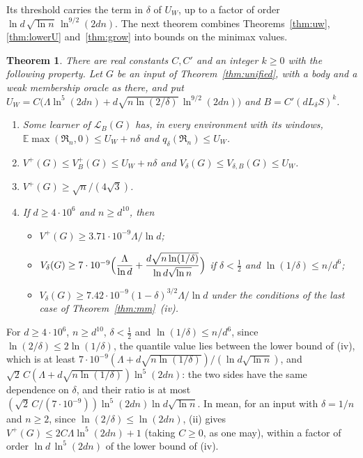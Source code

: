 \documentclass[11pt]{amsart}
\newtheorem{theorem}{Theorem}[section]
\theoremstyle{definition}
\numberwithin{equation}{section}
\newcommand{\E}{\mathbb{E}}
\newcommand{\Reg}{\mathfrak{R}}
\begin{document}
Its threshold carries the term in $\delta$ of $U_W$, up to a factor of order $\ln d\,\sqrt{\ln n}\,\ln^{9/2}(2dn)$. The next theorem combines Theorems~\ref{thm:uw}, \ref{thm:lowerU} and~\ref{thm:grow} into bounds on the minimax values.

\begin{theorem}\label{thm:mmm}
There are real constants $C,C'$ and an integer $k\ge0$ with the following property. Let $G$ be an input of Theorem~\ref{thm:unified}, with a body and a weak membership oracle as there, and put $U_W=C\bigl(\Lambda\ln^5(2dn)+d\sqrt{n\ln(2/\delta)}\,\ln^{9/2}(2dn)\bigr)$ and $B=C'(dL_\delta S)^k$.
\begin{enumerate}[label=(\roman*)]
\item Some learner of $\mathcal L_B(G)$ has, in every environment with its windows, $\E\max(\Reg_n,0)\le U_W+n\delta$ and $q_\delta(\Reg_n)\le U_W$.
\item $V^+(G)\le V^+_B(G)\le U_W+n\delta$ and $V_\delta(G)\le V_{\delta,B}(G)\le U_W$.
\item $V^+(G)\ge\sqrt n/(4\sqrt3)$.
\item If $d\ge4\cdot10^6$ and $n\ge d^{10}$, then
\begin{itemize}[leftmargin=*]
\item $V^+(G)\ge3.71\cdot10^{-9}\Lambda/\ln d$;
\item $V_\delta(G)\ge7\cdot10^{-9}\Bigl(\dfrac\Lambda{\ln d}+\dfrac{d\sqrt{n\ln(1/\delta)}}{\ln d\sqrt{\ln n}}\Bigr)$ if $\delta<\frac12$ and $\ln(1/\delta)\le n/d^6$;
\item $V_\delta(G)\ge7.42\cdot10^{-9}(1-\delta)^{3/2}\Lambda/\ln d$ under the conditions of the last case of Theorem~\ref{thm:mm}~(iv).
\end{itemize}
\end{enumerate}
\end{theorem}

For $d\ge4\cdot10^6$, $n\ge d^{10}$, $\delta<\frac12$ and $\ln(1/\delta)\le n/d^6$, since $\ln(2/\delta)\le2\ln(1/\delta)$, the quantile value lies between the lower bound of (iv), which is at least $7\cdot10^{-9}(\Lambda+d\sqrt{n\ln(1/\delta)})/(\ln d\sqrt{\ln n})$, and $\sqrt2\,C(\Lambda+d\sqrt{n\ln(1/\delta)})\ln^5(2dn)$: the two sides have the same dependence on $\delta$, and their ratio is at most $(\sqrt2\,C/(7\cdot10^{-9}))\ln^5(2dn)\ln d\sqrt{\ln n}$. In mean, for an input with $\delta=1/n$ and $n\ge2$, since $\ln(2/\delta)\le\ln(2dn)$, (ii) gives $V^+(G)\le2C\Lambda\ln^5(2dn)+1$ (taking $C\ge0$, as one may), within a factor of order $\ln d\,\ln^5(2dn)$ of the lower bound of (iv).
\end{document}
